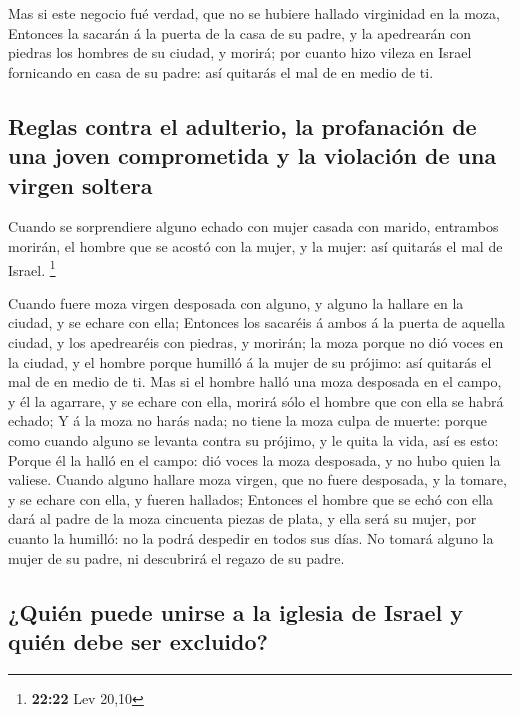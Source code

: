  Mas si este negocio fué verdad, que no se hubiere hallado
virginidad en la moza,  Entonces la sacarán á la puerta de
la casa de su padre, y la apedrearán con piedras los hombres de su
ciudad, y morirá; por cuanto hizo vileza en Israel fornicando en casa de
su padre: así quitarás el mal de en medio de ti.

\hypertarget{reglas-contra-el-adulterio-la-profanaciuxf3n-de-una-joven-comprometida-y-la-violaciuxf3n-de-una-virgen-soltera}{%
\subsection{Reglas contra el adulterio, la profanación de una joven
comprometida y la violación de una virgen
soltera}\label{reglas-contra-el-adulterio-la-profanaciuxf3n-de-una-joven-comprometida-y-la-violaciuxf3n-de-una-virgen-soltera}}

 Cuando se sorprendiere alguno echado con mujer casada con
marido, entrambos morirán, el hombre que se acostó con la mujer, y la
mujer: así quitarás el mal de Israel. \footnote{\textbf{22:22} Lev 20,10}

 Cuando fuere moza virgen desposada con alguno, y alguno la
hallare en la ciudad, y se echare con ella;  Entonces los
sacaréis á ambos á la puerta de aquella ciudad, y los apedrearéis con
piedras, y morirán; la moza porque no dió voces en la ciudad, y el
hombre porque humilló á la mujer de su prójimo: así quitarás el mal de
en medio de ti.  Mas si el hombre halló una moza desposada
en el campo, y él la agarrare, y se echare con ella, morirá sólo el
hombre que con ella se habrá echado;  Y á la moza no harás
nada; no tiene la moza culpa de muerte: porque como cuando alguno se
levanta contra su prójimo, y le quita la vida, así es esto:
 Porque él la halló en el campo: dió voces la moza
desposada, y no hubo quien la valiese.  Cuando alguno
hallare moza virgen, que no fuere desposada, y la tomare, y se echare
con ella, y fueren hallados;  Entonces el hombre que se
echó con ella dará al padre de la moza cincuenta piezas de plata, y ella
será su mujer, por cuanto la humilló: no la podrá despedir en todos sus
días.  No tomará alguno la mujer de su padre, ni descubrirá
el regazo de su padre.

\hypertarget{quiuxe9n-puede-unirse-a-la-iglesia-de-israel-y-quiuxe9n-debe-ser-excluido}{%
\subsection{¿Quién puede unirse a la iglesia de Israel y quién debe ser
excluido?}\label{quiuxe9n-puede-unirse-a-la-iglesia-de-israel-y-quiuxe9n-debe-ser-excluido}}

